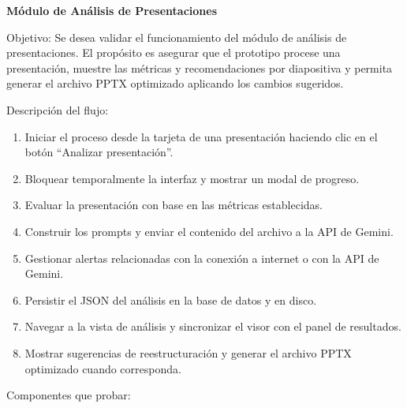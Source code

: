 \documentclass[11pt]{article}
\begin{document}
\clearpage
\textbf{Módulo de Análisis de Presentaciones}

Objetivo: Se desea validar el funcionamiento del módulo de análisis de presentaciones. El propósito es asegurar que el prototipo procese una presentación, muestre las métricas y recomendaciones por diapositiva y permita generar el archivo PPTX optimizado aplicando los cambios sugeridos.

Descripción del flujo:
\begin{enumerate}
    \item Iniciar el proceso desde la tarjeta de una presentación haciendo clic en el botón ``Analizar presentación''.
    \item Bloquear temporalmente la interfaz y mostrar un modal de progreso.
    \item Evaluar la presentación con base en las métricas establecidas.
    \item Construir los prompts y enviar el contenido del archivo a la API de Gemini.
    \item Gestionar alertas relacionadas con la conexión a internet o con la API de Gemini.
    \item Persistir el JSON del análisis en la base de datos y en disco.
    \item Navegar a la vista de análisis y sincronizar el visor con el panel de resultados.
    \item Mostrar sugerencias de reestructuración y generar el archivo PPTX optimizado cuando corresponda.
\end{enumerate}

Componentes que probar:
\end{document}
